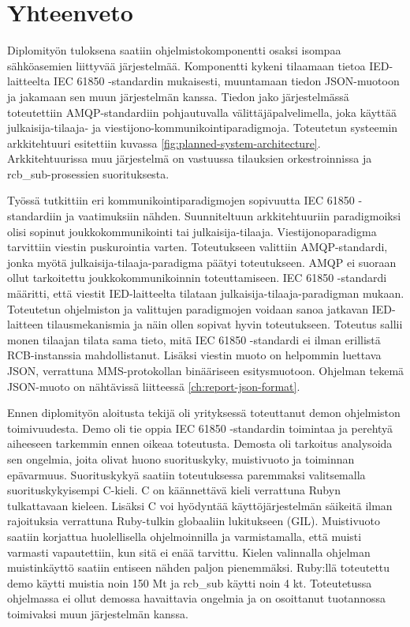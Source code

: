 \chapter{Yhteenveto}
\label{ch:yhteenveto}
Diplomityön tuloksena saatiin ohjelmistokomponentti osaksi isompaa sähköasemien liittyvää järjestelmää. Komponentti kykeni tilaamaan tietoa IED-laitteelta IEC 61850 -stan\-dar\-din mukaisesti, muuntamaan tiedon JSON-muotoon ja jakamaan sen muun järjestelmän kanssa. Tiedon jako järjestelmässä toteutettiin AMQP-standardiin pohjautuvalla välittäjäpalvelimella, joka käyttää julkaisija-tilaaja- ja viestijono-kommunikointiparadigmoja. Toteutetun systeemin arkkitehtuuri esitettiin kuvassa \ref{fig:planned-system-architecture}. Arkkitehtuurissa muu järjestelmä on vastuussa tilauksien orkestroinnissa ja rcb\_sub-prosessien suorituksesta.

Työssä tutkittiin eri kommunikointiparadigmojen sopivuutta IEC 61850 -standardiin ja vaatimuksiin nähden. Suunniteltuun arkkitehtuuriin paradigmoiksi olisi sopinut joukkokommunikointi tai julkaisija-tilaaja. Viestijonoparadigma tarvittiin viestin puskurointia varten. Toteutukseen valittiin AMQP-standardi, jonka myötä julkaisija-tilaaja-paradigma päätyi toteutukseen. AMQP ei suoraan ollut tarkoitettu joukkokommunikoinnin toteuttamiseen. IEC 61850 -standardi määritti, että viestit IED-laitteelta tilataan julkaisija-tilaaja-paradigman mukaan. Toteutetun ohjelmiston ja valittujen paradigmojen voidaan sanoa jatkavan IED-laitteen tilausmekanismia ja näin ollen sopivat hyvin toteutukseen. Toteutus sallii monen tilaajan tilata sama tieto, mitä IEC 61850 -standardi ei ilman erillistä RCB-instanssia mahdollistanut. Lisäksi viestin muoto on helpommin luettava JSON, verrattuna MMS-protokollan binääriseen esitysmuotoon. Ohjelman tekemä JSON-muoto on nähtävissä liitteessä \ref{ch:report-json-format}.

Ennen diplomityön aloitusta tekijä oli yrityksessä toteuttanut demon ohjelmiston toimivuudesta. Demo oli tie oppia IEC 61850 -standardin toimintaa ja perehtyä aiheeseen tarkemmin ennen oikeaa toteutusta. Demosta oli tarkoitus analysoida sen ongelmia, joita olivat huono suorituskyky, muistivuoto ja toiminnan epävarmuus. Suorituskykyä saatiin toteutuksessa paremmaksi valitsemalla suorituskykyisempi C-kieli. C on käännettävä kieli verrattuna Rubyn tulkattavaan kieleen. Lisäksi C voi hyödyntää käyttöjärjestelmän säikeitä ilman rajoituksia verrattuna Ruby-tulkin globaaliin lukitukseen (GIL). Muistivuoto saatiin korjattua huolellisella ohjelmoinnilla ja varmistamalla, että muisti varmasti vapautettiin, kun sitä ei enää tarvittu. Kielen valinnalla ohjelman muistinkäyttö saatiin entiseen nähden paljon pienemmäksi. Ruby:llä toteutettu demo käytti muistia noin 150 Mt ja rcb\_sub käytti noin 4 kt. Toteutetussa ohjelmassa ei ollut demossa havaittavia ongelmia ja on osoittanut tuotannossa toimivaksi muun järjestelmän kanssa.

